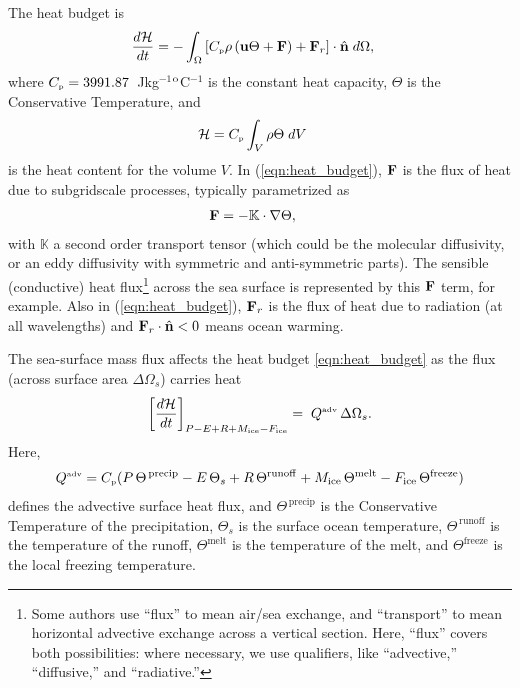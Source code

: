 \documentclass[10pt]{amsart}
\newcommand{\Cp}{C_{\mbox{\tiny p}}}
\newcommand{\degreeCelsius}{$^{\rm o}$C}
\newcommand{\Qadv}{Q^{\mbox{\tiny adv}}}
\newcommand{\surf}{\Omega}
\begin{document}
The heat budget is
\begin{align}
\frac{d {\mathcal H}}{d t} & = - \int_\surf \left[ \Cp \rho \left( {\bf u} \Theta + {\bf F} \right) + {\bf F}_{r} \right] \cdot {\hat{\bf n}} \; d \surf ,
\label{eqn:heat_budget}
\end{align}
where  $\Cp=3991.87$~Jkg$^{-1}$\degreeCelsius$^{-1}$ is the constant heat capacity, $\Theta$ is the Conservative Temperature, and 
\begin{align}
{\mathcal H} & =  \Cp \int_V\rho \Theta \; d V 
\end{align}
is the heat content for the volume $V$.
In (\ref{eqn:heat_budget}), ${\bf F}$ is the flux of heat due to subgridscale processes, typically parametrized as
\begin{align}
{\bf F} & = - \mathbb{K} \cdot \nabla \Theta, 
\label{eqn:flux-gradient-relation}
\end{align}
with $\mathbb{K}$ a second order transport tensor (which could be the molecular diffusivity, or an eddy diffusivity with symmetric and anti-symmetric parts).
The sensible (conductive) heat flux\footnote{Some authors use ``flux'' to mean air/sea exchange, and ``transport'' to mean horizontal advective exchange across a vertical section. Here, ``flux'' covers both possibilities: where necessary, we use qualifiers, like ``advective,'' ``diffusive,'' and ``radiative.''} across the sea surface is represented by this ${\bf F}$ term, for example.
Also in (\ref{eqn:heat_budget}), ${\bf F}_{r}$ is the flux of heat due to radiation (at all wavelengths) and ${\bf F}_{r} \cdot {\hat {\bf n}} < 0$ means ocean warming.

The sea-surface mass flux affects the heat budget \eqref{eqn:heat_budget} as the flux (across surface area $\Delta \Omega _s$) carries heat
\begin{equation}
 \left[ \frac{ d\mathcal{H} }{dt} \right]_{ P-E+R+M_{\mathrm{ice}} - F_{\mathrm{ice}}}  
= \; \Qadv \, \Delta \Omega _s .
\label{eqn:surface-flux-p-e+r}
\end{equation}
Here,
\begin{align}
\Qadv = \Cp  (P\, \Theta^{\,\mathrm{precip}}  - E\, \Theta_s +  R\, \Theta^\mathrm{runoff}  +
M_{\mathrm{ice}} \, \Theta^\mathrm{melt} - F_{\mathrm{ice}} \, \Theta^\mathrm{freeze})
\label{eqn:Qadv}
\end{align} 
defines the advective surface heat flux, and $\Theta^{\,\mathrm{precip}}$ is the Conservative Temperature of the precipitation, $\Theta_s$ is the surface ocean temperature,  $\Theta^{\,\mathrm{runoff}}$ is the temperature of the runoff, $\Theta^\mathrm{melt}$ is the temperature of the melt, and $\Theta^\mathrm{freeze}$ is the local freezing temperature. 
\end{document}
